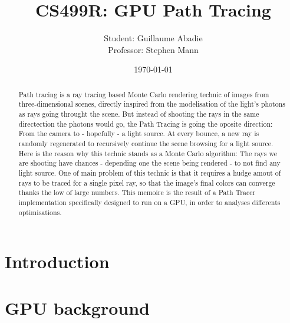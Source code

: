 \documentclass[10pt,twocolumn,a4paper]{article}
\begin{document}
\title{CS499R: GPU Path Tracing}
\author{
    Student: Guillaume Abadie\\
    Professor: Stephen Mann
}
\date{\today}
\maketitle

\begin{abstract}

Path tracing is a ray tracing based Monte Carlo rendering technic of images from
three-dimensional scenes, directly inspired from the modelisation of the light's
photons as rays going throught the scene. But instead of shooting the rays in the
same directection the photons would go, the Path Tracing is going the oposite
direction: From the camera to - hopefully - a light source. At every bounce, a new
ray is randomly regenerated to recursively continue the scene browsing for a
light source. Here is the reason why this technic stands as a Monte Carlo
algorithm: The rays we are shooting have chances - depending one the scene
being rendered - to not find any light source. One of main problem of this
technic is that it requires a hudge
amout of rays to be traced for a single pixel ray, so that the image's final
colors can converge thanks the low of large numbers. This memoire is the result
of a Path Tracer implementation
specifically designed to run on a GPU, in order to analyses differents
optimisations.

\end{abstract}

\section{Introduction}


\section{GPU background}


\end{document}
